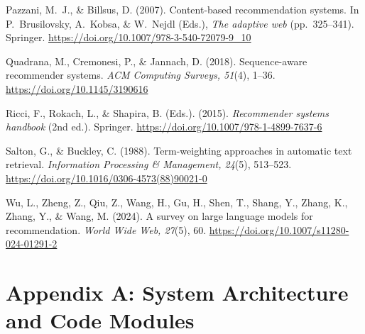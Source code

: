 \documentclass[12pt,letterpaper]{article}
\begin{document}
Pazzani, M.~J., \& Billsus, D. (2007). Content-based recommendation systems. In P.~Brusilovsky, A.~Kobsa, \& W.~Nejdl (Eds.), \textit{The adaptive web} (pp.~325--341). Springer. \url{https://doi.org/10.1007/978-3-540-72079-9_10}

Quadrana, M., Cremonesi, P., \& Jannach, D. (2018). Sequence-aware recommender systems. \textit{ACM Computing Surveys, 51}(4), 1--36. \url{https://doi.org/10.1145/3190616}

Ricci, F., Rokach, L., \& Shapira, B. (Eds.). (2015). \textit{Recommender systems handbook} (2nd ed.). Springer. \url{https://doi.org/10.1007/978-1-4899-7637-6}

Salton, G., \& Buckley, C. (1988). Term-weighting approaches in automatic text retrieval. \textit{Information Processing \& Management, 24}(5), 513--523. \url{https://doi.org/10.1016/0306-4573(88)90021-0}

Wu, L., Zheng, Z., Qiu, Z., Wang, H., Gu, H., Shen, T., Shang, Y., Zhang, K., Zhang, Y., \& Wang, M. (2024). A survey on large language models for recommendation. \textit{World Wide Web, 27}(5), 60. \url{https://doi.org/10.1007/s11280-024-01291-2}
\par
\endgroup

\newpage
\section{Appendix A: System Architecture and Code Modules}\label{app:code}
\end{document}
